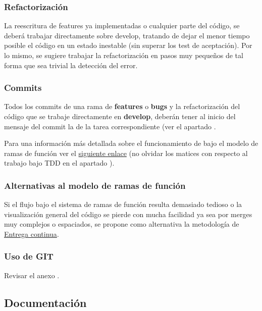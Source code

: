 \subsubsection{Refactorización}
La reescritura de features ya implementadas o cualquier parte del código, se deberá trabajar directamente sobre develop, tratando de dejar el menor tiempo posible el código en un estado inestable (sin superar los test de aceptación). Por lo mismo, se sugiere trabajar la refactorización en pasos muy pequeños de tal forma que sea trivial la detección del error.

\subsubsection{Commits}
Todos los commits de una rama de \textbf{features} o \textbf{bugs} y la refactorización del código que se trabaje directamente en \textbf{develop}, deberán tener al inicio del mensaje del commit la  de la tarea correspondiente (ver el apartado .

Para una información más detallada sobre el funcionamiento de  bajo el modelo de ramas de función ver el \href{https://www.atlassian.com/es/git/tutorials/comparing-workflows/feature-branch-workflow}{siguiente enlace} (no olvidar los matices con respecto al trabajo bajo TDD en el apartado ).

\subsubsection{Alternativas al modelo de ramas de función}\label{flujo:alternativas-al-branching}
Si el flujo bajo el sistema de ramas de función resulta demasiado tedioso o la visualización general del código se pierde con mucha facilidad ya sea por merges muy complejos o espaciados, se propone como alternativa la metodología de \href{https://es.wikipedia.org/wiki/Entrega_continua}{Entrega continua}.

\subsubsection{Uso de GIT}
Revisar el anexo .


\subsection{Documentación}\label{flujo:documentacion}


